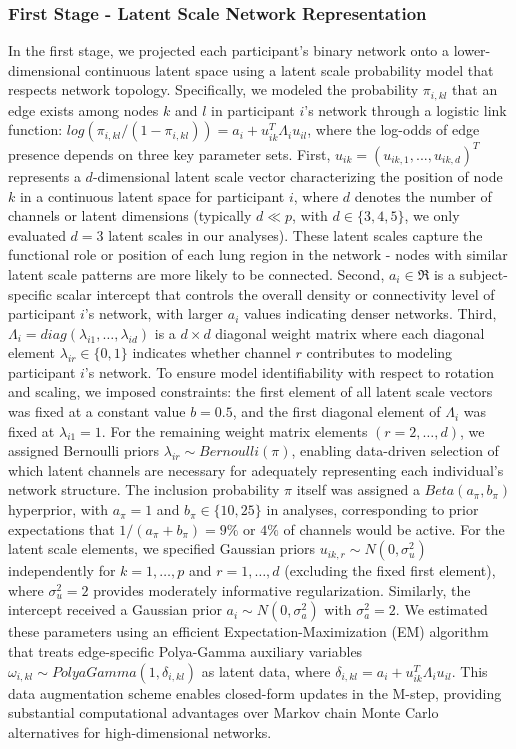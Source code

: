 \documentclass[pdflatex,article,12pt]{article}
\begin{document}
\subsubsection{First Stage - Latent Scale Network Representation}
In the first stage, we projected each participant's binary network onto a lower-dimensional continuous latent space using a latent scale probability model that respects network topology. Specifically, we modeled the probability $\pi_{i,kl}$ that an edge exists among nodes $k$ and $l$ in participant $i$'s network through a logistic link function: $log(\pi_{i,kl}/(1-\pi_{i,kl})) = a_i + u_{ik}^T \Lambda_i u_{il}$, where the log-odds of edge presence depends on three key parameter sets. First, $u_{ik} = (u_{ik,1}, ..., u_{ik,d})^T$ represents a $d$-dimensional latent scale vector characterizing the position of node $k$ in a continuous latent space for participant $i$, where $d$ denotes the number of channels or latent dimensions (typically $d \ll p$, with $d \in \{3,4,5\}$, we only evaluated $d=3$ latent scales in our analyses). These latent scales capture the functional role or position of each lung region in the network - nodes with similar latent scale patterns are more likely to be connected. Second, $a_i \in \Re$ is a subject-specific scalar intercept that controls the overall density or connectivity level of participant $i$'s network, with larger $a_i$ values indicating denser networks. Third, $\Lambda_i = diag(\lambda_{i1}, \ldots, \lambda_{id})$ is a $d \times d$ diagonal weight matrix where each diagonal element $\lambda_{ir} \in \{0,1\}$ indicates whether channel $r$ contributes to modeling participant $i$'s network. To ensure model identifiability with respect to rotation and scaling, we imposed constraints: the first element of all latent scale vectors was fixed at a constant value $b = 0.5$, and the first diagonal element of $\Lambda_i$ was fixed at $\lambda_{i1} = 1$. For the remaining weight matrix elements $(r = 2,\ldots, d)$, we assigned Bernoulli priors $\lambda_{ir} \sim Bernoulli(\pi)$, enabling data-driven selection of which latent channels are necessary for adequately representing each individual's network structure. The inclusion probability $\pi$ itself was assigned a $Beta(a_{\pi}, b_{\pi})$ hyperprior, with $a_{\pi} = 1$ and $b_{\pi} \in \{10, 25\}$ in analyses, corresponding to prior expectations that $1/(a_{\pi} + b_{\pi}) = 9\%$ or $4\%$ of channels would be active. For the latent scale elements, we specified Gaussian priors $u_{ik,r} \sim N(0, \sigma_u^2)$ independently for $k = 1, \ldots, p$ and $r = 1, \ldots, d$ (excluding the fixed first element), where $\sigma_u^2 = 2$ provides moderately informative regularization. Similarly, the intercept received a Gaussian prior $a_i \sim N(0, \sigma_a^2)$ with $\sigma_a^2 = 2$. We estimated these parameters using an efficient Expectation-Maximization (EM) algorithm that treats edge-specific Polya-Gamma auxiliary variables $\omega_{i,kl} \sim PolyaGamma(1, \delta_{i,kl})$ as latent data, where $\delta_{i,kl} = a_i + u_{ik}^T \Lambda_i u_{il}$. This data augmentation scheme enables closed-form updates in the M-step, providing substantial computational advantages over Markov chain Monte Carlo alternatives for high-dimensional networks. 
\end{document}

